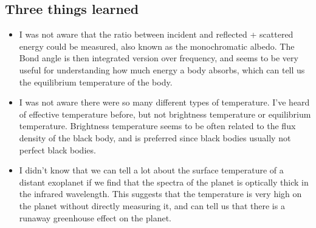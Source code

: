 \documentclass[10pt]{article}
\begin{document}
	
	
	
	
	\subsection*{Three things learned}
	\begin{itemize}
		\item I was not aware that the ratio between incident and reflected + scattered energy could be measured, also known as the monochromatic albedo. The Bond angle is then integrated version over frequency, and seems to be very useful for understanding how much energy a body absorbs, which can tell us the equilibrium temperature of the body.
		
		\item I was not aware there were so many different types of temperature. I've heard of effective temperature before, but not brightness temperature or equilibrium temperature. Brightness temperature seems to be often related to the flux density of the black body, and is preferred since black bodies usually not perfect black bodies. 
			
		\item I didn't know that we can tell a lot about the surface temperature of a distant exoplanet if we find that the spectra of the planet is optically thick in the infrared wavelength. This suggests that the temperature is very high on the planet without directly measuring it, and can tell us that there is a runaway greenhouse effect on the planet.
	\end{itemize}
	
	
\end{document}
